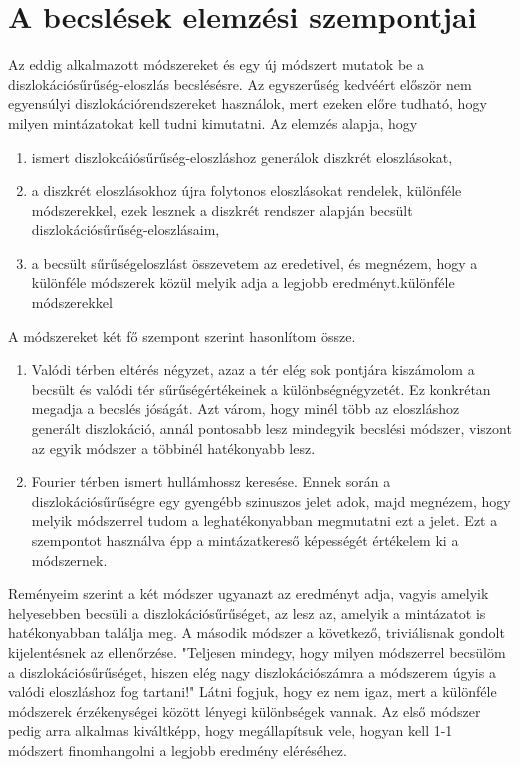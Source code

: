 \documentclass[10pt,a4paper]{scrartcl}
\begin{document}
\section{A becslések elemzési szempontjai}
Az eddig alkalmazott módszereket és egy új módszert mutatok be a diszlokációsűrűség-eloszlás becslésésre. Az egyszerűség kedvéért először nem egyensúlyi diszlokációrendszereket használok, mert ezeken előre tudható, hogy milyen mintázatokat kell tudni kimutatni. Az elemzés alapja, hogy
\begin{enumerate}
    \item ismert diszlokcáiósűrűség-eloszláshoz generálok diszkrét eloszlásokat,
    \item a diszkrét eloszlásokhoz újra folytonos eloszlásokat rendelek, különféle módszerekkel, ezek lesznek a diszkrét rendszer alapján becsült diszlokációsűrűség-eloszlásaim,
    \item a becsült sűrűségeloszlást összevetem az eredetivel, és megnézem, hogy a különféle módszerek közül melyik adja a legjobb eredményt.különféle módszerekkel
\end{enumerate}

A módszereket két fő szempont szerint hasonlítom össze.
\begin{enumerate}
    \item Valódi térben eltérés négyzet, azaz a tér elég sok pontjára kiszámolom a becsült és valódi tér sűrűségértékeinek a különbségnégyzetét. Ez konkrétan megadja a becslés jóságát. Azt várom, hogy minél több az eloszláshoz generált diszlokáció, annál pontosabb lesz mindegyik becslési módszer, viszont az egyik módszer a többinél hatékonyabb lesz.
    \item Fourier térben ismert hullámhossz keresése. Ennek során a diszlokációsűrűségre egy gyengébb szinuszos jelet adok, majd megnézem, hogy melyik módszerrel tudom a leghatékonyabban megmutatni ezt a jelet. Ezt a szempontot használva épp a mintázatkereső képességét értékelem ki a módszernek.
\end{enumerate}

Reményeim szerint a két módszer ugyanazt az eredményt adja, vagyis amelyik helyesebben becsüli a diszlokációsűrűséget, az lesz az, amelyik a mintázatot is hatékonyabban találja meg. A második módszer a következő, triviálisnak gondolt kijelentésnek az ellenőrzése. "Teljesen mindegy, hogy milyen módszerrel becsülöm a diszlokációsűrűséget, hiszen elég nagy diszlokációszámra a módszerem úgyis a valódi eloszláshoz fog tartani!" Látni fogjuk, hogy ez nem igaz, mert a különféle módszerek érzékenységei között lényegi különbségek vannak. Az első módszer pedig arra alkalmas kiváltképp, hogy megállapítsuk vele, hogyan kell 1-1 módszert finomhangolni a legjobb eredmény eléréséhez.
\end{document}
